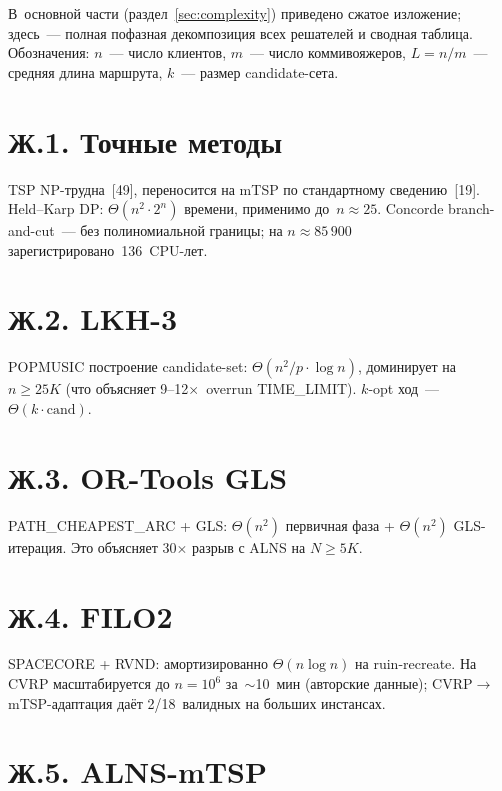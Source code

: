 \documentclass[a4paper,14pt]{extreport}
\begin{document}
В~основной части (раздел~\ref{sec:complexity}) приведено сжатое изложение; здесь~--- полная пофазная декомпозиция всех решателей и сводная таблица.
Обозначения: $n$~--- число клиентов, $m$~--- число коммивояжеров, $L = n/m$~--- средняя длина маршрута, $k$~--- размер candidate-сета.

\section*{Ж.1. Точные методы}

TSP NP-трудна~[49], переносится на mTSP по стандартному сведению~[19]. Held--Karp DP: $\Theta(n^2\cdot 2^n)$ времени, применимо до~$n\approx 25$. Concorde branch-and-cut~--- без полиномиальной границы; на $n\approx 85\,900$ зарегистрировано~136~CPU-лет.

\section*{Ж.2. LKH-3}

POPMUSIC построение candidate-set: $\Theta(n^2/p\cdot\log n)$, доминирует на $n\geq 25K$ (что объясняет 9--12$\times$~overrun TIME\_LIMIT). $k$-opt ход~--- $\Theta(k\cdot\mathrm{cand})$.

\section*{Ж.3. OR-Tools GLS}

PATH\_CHEAPEST\_ARC + GLS: $\Theta(n^2)$ первичная фаза + $\Theta(n^2)$ GLS-итерация. Это объясняет 30$\times$ разрыв с ALNS на $N\geq 5K$.

\section*{Ж.4. FILO2}

SPACECORE + RVND: амортизированно $\Theta(n\log n)$ на ruin-recreate. На CVRP масштабируется до $n=10^6$ за~$\sim$10~мин (авторские данные); CVRP$\to$mTSP-адаптация даёт 2/18~валидных на больших инстансах.

\section*{Ж.5. ALNS-mTSP}
\end{document}
